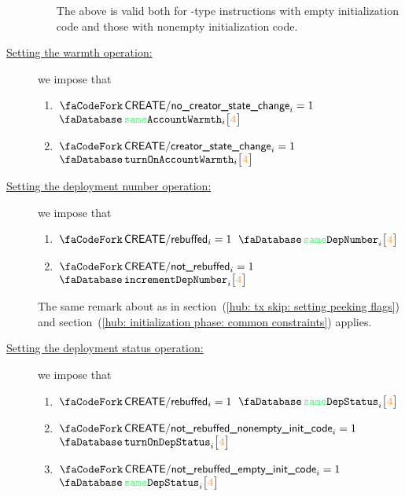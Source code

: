 \begin{description}
\begin{enumerate}
\[				\]
				\saNote{}
				The above is valid both for -type instructions with empty initialization code and those with nonempty initialization code.
		\end{enumerate}
	\item[\underline{Setting the warmth operation:}]
		we impose that
		\begin{enumerate}
			\item \If $\scenCreateNoCreatorStateChange _{i} = 1$ \Then $\accSameWarmth   {i}{\createFirstCreateeAccountRowOffset}$
			\item \If $\scenCreateCreatorStateChange   _{i} = 1$ \Then $\accTurnOnWarmth {i}{\createFirstCreateeAccountRowOffset}$
		\end{enumerate}
	\item[\underline{Setting the deployment number operation:}]
		we impose that
		\begin{enumerate}
			\item \If $\scenCreateRebuffed    _{i} = 1$ \Then $\accSameDeploymentNumber       {i}{\createFirstCreateeAccountRowOffset}$
			\item \If $\scenCreateNotRebuffed _{i} = 1$ \Then $\accIncrementDeploymentNumber  {i}{\createFirstCreateeAccountRowOffset}$
		\end{enumerate}
		\saNote{}
		The same remark about \accDeploymentNumber{} as in
		section~(\ref{hub: tx skip: setting peeking flags}) and
		section~(\ref{hub: initialization phase: common constraints}) applies.
	\item[\underline{Setting the deployment status operation:}]
		we impose that
		\begin{enumerate}
			\item \If $\scenCreateRebuffed    _{i} = 1$ \Then $\accSameDeploymentStatus       {i}{\createFirstCreateeAccountRowOffset}$
			\item \If $\scenCreateExecutionNonEmptyInitCode _{i} = 1$ \Then $\accTurnOnDepStatus {i}{\createFirstCreateeAccountRowOffset}$
			\item \If $\scenCreateExecutionEmptyInitCode    _{i} = 1$ \Then $\accSameDeploymentStatus   {i}{\createFirstCreateeAccountRowOffset}$
		\end{enumerate}
\end{description}

